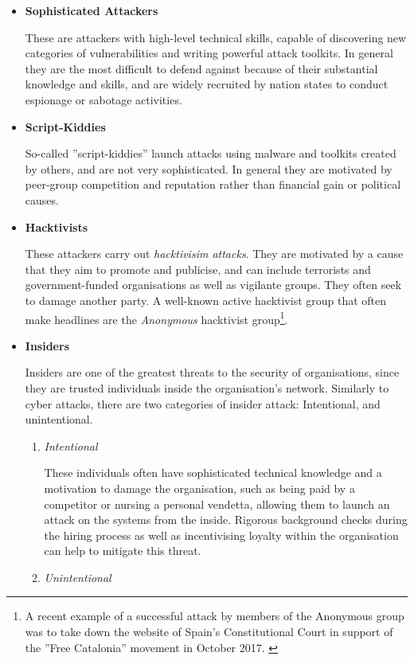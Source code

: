 	\begin{itemize}
	    \item \textbf{Sophisticated Attackers}
    
    These are attackers with high-level technical skills, capable of discovering new categories of vulnerabilities and writing powerful attack toolkits. In general they are the most difficult to defend against because of their substantial knowledge and skills, and are widely recruited by nation states to conduct espionage or sabotage activities. 
    \linebreak
    \item \textbf{Script-Kiddies}
    
		So-called ''script-kiddies'' launch attacks using malware and toolkits created by others, and are not very sophisticated. In general they are motivated by peer-group competition and reputation rather than financial gain or political causes.
        
    \item \textbf{Hacktivists}
    
    These attackers carry out \textit{hacktivisim attacks}. They are motivated by a cause that they aim to promote and publicise, and can include terrorists and government-funded organisations as well as vigilante groups. They often seek to damage another party.  A well-known active hacktivist group that often make headlines are the \textit{Anonymous} hacktivist group\footnote{A recent example of a successful attack by members of the Anonymous group was to take down the website of Spain's Constitutional Court in support of the ''Free Catalonia'' movement in October 2017. \cite{AnonymousHacktivismFreeCatalonia}}. 

	\item \textbf{Insiders}
			
            Insiders are one of the greatest threats to the security of organisations, since they are trusted individuals inside the organisation's network. Similarly to cyber attacks, there are two categories of insider attack: Intentional, and unintentional.
            \begin{enumerate}
            \item \textit{Intentional}
            
            These individuals often have sophisticated technical knowledge and a motivation to damage the organisation, such as being paid by a competitor or nursing a personal vendetta, allowing them to launch an attack on the systems from the inside.  Rigorous background checks during the hiring process as well as incentivising loyalty within the organisation can help to mitigate this threat.
           \item \textit{Unintentional}
            

\end{enumerate}
\end{itemize}
